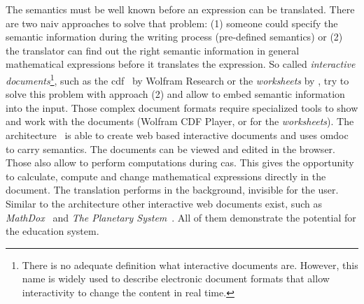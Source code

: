 The semantics must be well known before an expression can be translated. There are two naiv approaches to solve that problem: (1) someone could specify the semantic information during the writing process (pre-defined semantics) or (2) the translator can find out the right semantic information in general mathematical expressions before it translates the expression. So called \textit{interactive documents}\footnote{There is no adequate definition what interactive documents are. However, this name is widely used to describe electronic document formats that allow interactivity to change the content in real time.}, such as the \gls*{cdf}~\parencite{CDF:Wolfram} by Wolfram Research or the \textit{worksheets} by \Maple{}, try to solve this problem with approach (2) and allow to embed semantic information into the input. Those complex document formats require specialized tools to show and work with the documents (Wolfram CDF Player, or \Maple{} for the \textit{worksheets}). The \JOBAD{} architecture~\parencite{JOBAD:orig} is able to create web based interactive documents and uses \gls*{omdoc}~\parencite{OMDoc} to carry semantics. The documents can be viewed and edited in the browser. Those  also allow to perform computations during \gls*{cas}. This gives the opportunity to calculate, compute and change mathematical expressions directly in the document. The translation performs in the background, invisible for the user. Similar to the \JOBAD{} architecture other interactive web documents exist, such as \textit{MathDox}~\parencite{MathDox} and \textit{The Planetary System}~\parencite{Planetary}. All of them demonstrate the potential for the education system.


